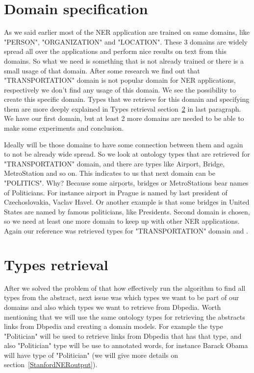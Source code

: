\documentclass[thesis=M,english]{FITthesis}[2018/05/30]
\begin{document}
\section{Domain specification}\label{domainSpecification}
As we said earlier most of the NER application are trained on same domains, like "PERSON", "ORGANIZATION" and "LOCATION". These 3 domains are widely spread all over the applications and perform nice results on text from this domains. So what we need is something that is not already trained or there is a small usage of that domain. After some research we find out that "TRANSPORTATION" domain is not popular domain for NER applications, respectively we don't find any usage of this domain. We see the possibility to create this specific domain. Types that we retrieve for this domain and specifying them are more deeply explained in Types retrieval section~\ref{typesRetrieval} in last paragraph. We have our first domain, but at least 2 more domains are needed to be able to make some experiments and conclusion. 

Ideally will be those domains to have some connection between them and again to not be already wide spread. So we look at ontology types that are retrieved for "TRANSPORTATION" domain, and there are types like Airport, Bridge, MetroStation and so on. This indicates to us that next domain can be "POLITICS". Why? Because some airports, bridges or MetroStations bear names of Politicians. For instance airport in Prague is named by last president of Czechoslovakia, Vaclav Havel. Or another example is that some bridges in United States are named by famous politicians, like Presidents. Second domain is chosen, so we need at least one more domain to keep up with other NER applications. Again our reference was retrieved types for "TRANSPORTATION" domain and .


\section{Types retrieval}\label{typesRetrieval}
After we solved the problem of that how effectively run the algorithm to find all types from the abstract, next issue was which types we want to be part of our domains and also which types we want to retrieve from Dbpedia. Worth mentioning that we will use the same ontology types for retrieving the abstracts links from Dbpedia and creating a domain models. For example the type "Politician" will be used to retrieve links from Dbpedia that has that type, and also "Politician" type will be use to annotated words, for instance Barack Obama will have type of "Politician" (we will give more details on section~\ref{StanfordNERoutput}).
\end{document}
